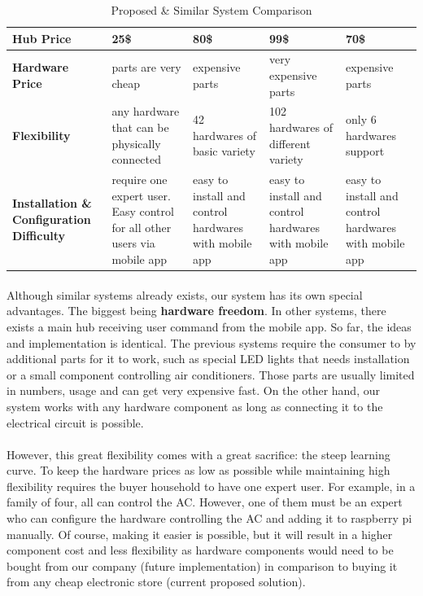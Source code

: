 \documentclass[12pt]{paper}
\begin{document}
\begin{table}[H]
\begin{center}
\begin{tabularx}{1\linewidth}{|m{2.2cm}*4{|X}|}
					\textbf{Hub Price} & 25\$ & 80\$ & 99\$ & 70\$ \\\hline
					\textbf{Hardware Price} & parts are very cheap &  expensive parts & very expensive parts & expensive parts \\\hline
					\textbf{Flexibility} & any hardware that can be physically connected & 42 hardwares of basic variety\cite{insteon_p} & 102 hardwares of different variety\cite{wink_p} & only 6 hardwares support \cite{samsung_p} \\\hline
					
					\textbf{Installation \& Configuration Difficulty} & require one expert user. Easy control for all other users via mobile app & easy to install and control hardwares with mobile app  &easy to install and control hardwares with mobile app  & easy to install and control hardwares with mobile app
					\\\hline
				\end{tabularx}
			\end{center}
			\caption{Proposed \& Similar System Comparison}
			\label{table:compare}
		\end{table}
		\label{future}
		\paragraph{} Although similar systems already exists, our system has its own special advantages. The biggest being \textbf{hardware freedom}. In other systems, there exists a main hub receiving user command from the mobile app. So far, the ideas and implementation is identical. The previous systems require the consumer to by additional parts for it to work, such as special LED lights that needs installation or a small component controlling air conditioners. Those parts are usually limited in numbers, usage and can get very expensive fast. On the other hand, our system works with any hardware component as long as connecting it to the electrical circuit is possible.
		\paragraph{} However, this great flexibility comes with a great sacrifice: the steep learning curve. To keep the hardware prices as low as possible while maintaining high flexibility requires the buyer household to have one expert user. For example, in a family of four, all can control the AC. However, one of them must be an expert who can configure the hardware controlling the AC and adding it to raspberry pi manually. Of course, making it easier is possible, but it will result in a higher component cost and less flexibility as hardware components would need to be bought from our company (future implementation) in comparison to buying it from any cheap electronic store (current proposed solution).
\end{document}
